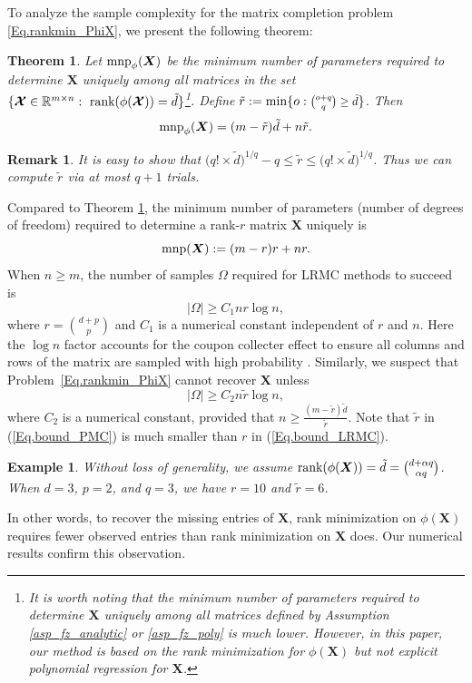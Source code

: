 \documentclass[letterpaper]{article} %
\newtheorem{theorem}{Theorem}
\newtheorem{example}{Example}
\newtheorem{remark}{Remark}
\begin{document}
To analyze the sample complexity for the matrix completion problem \eqref{Eq.rankmin_PhiX}, we present the following theorem:
\begin{theorem}\label{theo_mnp}
Let $\textup{mnp}_{\phi}(\bm{X})$ be the minimum number of parameters required to determine $\bm{X}$ uniquely among all matrices in the set $\lbrace \bm{\mathcal{X}}\in\mathbb{R}^{m\times n}:\ \textup{rank}(\phi(\bm{\mathcal{X}}))=\tilde{d}\rbrace$\footnote{It is worth noting that the minimum number of parameters required to determine $\bm{X}$ uniquely among all matrices defined by Assumption \ref{asp_fz_analytic} or \ref{asp_fz_poly} is much lower. However, in this paper, our method is based on the rank minimization for $\phi(\bm{X})$ but not explicit polynomial regression for $\bm{X}$.}. Define $\tilde{r}:=\min\lbrace o:\scaleobj{0.9}{\binom{o+q}{q}\geq \tilde{d}}\rbrace$. Then
\begin{equation}\label{Eq.bound_HRMC}
\textup{mnp}_{\phi}(\bm{X})=(m-\tilde{r}) \tilde{d}+n\tilde{r}.
\end{equation}
\end{theorem}
\begin{remark}
\textup{
It is easy to show that $\big(q!\times\tilde{d}\big)^{1/q}-q\leq \tilde{r}\leq \big(q!\times\tilde{d}\big)^{1/q}$. Thus we can compute $\tilde{r}$ via at most $q+1$ trials.}
\end{remark}

Compared to Theorem \ref{theo_mnp}, the minimum number of parameters (number of degrees of freedom) required to determine a rank-$r$ matrix $\bm{X}$ uniquely is
\begin{equation}
\textup{mnp}(\bm{X}):=(m-r)r+nr.
\end{equation}
When $n\geq m$, the number of samples $\Omega$ required for LRMC methods to succeed \cite{CandesRecht2009} is
\begin{equation}\label{Eq.bound_LRMC}
\vert \Omega\vert\geq C_1 nr\log n,
\end{equation}
where $r=\binom{d+p}{p}$ and $C_1$ is a numerical constant independent of $r$ and $n$.  Here the $\log n$ factor accounts for the coupon collecter effect to ensure all columns and rows of the matrix are sampled with high probability \cite{CandesRecht2009}.
Similarly, we suspect that Problem~\eqref{Eq.rankmin_PhiX} cannot recover $\bm{X}$ unless
\begin{equation}\label{Eq.bound_PMC}
\vert \Omega\vert\geq C_2 n\tilde{r}\log n,
\end{equation}
where $C_2$ is a numerical constant, provided that $n\geq \tfrac{(m-\tilde{r}) \tilde{d}}{\tilde{r}}$.
Note that $\tilde{r}$ in (\ref{Eq.bound_PMC}) is much smaller than $r$ in (\ref{Eq.bound_LRMC}).
\begin{example}
Without loss of generality, we assume $\textup{rank}(\phi(\bm{X}))=\tilde{d}=\binom{d+\alpha q}{\alpha q}$. When $d=3$, $p=2$, and $q=3$, we have $r=10$ and $\tilde{r}=6$.
\end{example}
\noindent
In other words, to recover the missing entries of $\bm{X}$, rank minimization on $\phi(\bm{X})$ requires fewer observed entries than rank minimization on $\bm{X}$ does.
Our numerical results confirm this observation.
\end{document}
